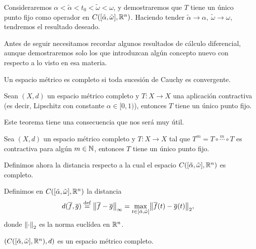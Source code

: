 \documentclass[../ecuaciones_diferenciales.tex]{subfiles}
\begin{document}
Consideraremos \(\alpha < \tilde{\alpha} < t_0 < \tilde{\omega} < \omega\), y
demostraremos que \(T\) tiene un único punto fijo como operador en
\(C([\tilde{\alpha}, \tilde{\omega}], \mathbb{R}^n)\). Haciendo tender \(\tilde{\alpha}
\to \alpha,\ \tilde{\omega} \to \omega\), tendremos el resultado deseado.

Antes de seguir necesitamos recordar algunos resultados de cálculo diferencial,
aunque demostraremos solo los que introduzcan algún concepto nuevo con respecto 
a lo visto en esa materia.

\begin{definition}
	Un espacio métrico es completo si toda sucesión de Cauchy es convergente.
\end{definition}

\begin{theorem}
	Sean \((X, d)\) un espacio métrico completo y \(T : X \to X\) una aplicación
	contractiva (es decir, Lipschitz con constante \(\alpha \in [0, 1)\)), 
	entonces \(T\) tiene un único punto fijo.
\end{theorem}

Este teorema tiene una consecuencia que nos será muy útil.

\begin{corollary} \label{cor:banach_fixed_point}
	Sea \((X, d)\) un espacio métrico completo y \(T : X \to X\) tal que
	\(T^m = T \circ \overset{m}{\cdots} \circ T\) es contractiva para algún
	\(m \in \mathbb{N}\), entonces \(T\) tiene un único punto fijo.
\end{corollary}

Definimos ahora la distancia respecto a la cual el espacio 
\(C([\tilde{\alpha}, \tilde{\omega}], \mathbb{R}^n)\) es completo.

\begin{definition}
	Definimos en \(C([\tilde{\alpha}, \tilde{\omega}], \mathbb{R}^n)\) la distancia
	\[d(\vec{f}, \vec{g}) \assign \norm{\vec{f} - \vec{g}}_{\infty} 
		= \max_{t \in [\tilde{\alpha}, \tilde{\omega}]} 
			\norm{\vec{f}(t) - \vec{g}(t)}_2,\]
	donde \(\norm{\cdot}_2\) es la norma euclídea en \(\mathbb{R}^n\). 
\end{definition}

\begin{proposition}
	\((C([\tilde{\alpha}, \tilde{\omega}], \mathbb{R}^n), d)\) 
	es un espacio métrico completo.
\end{proposition}
\end{document}
